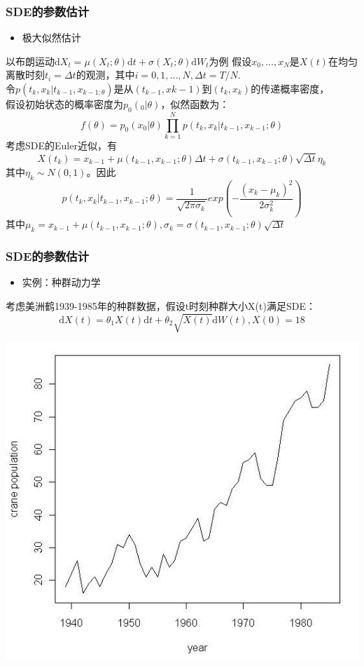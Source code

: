 \documentclass{ctexbeamer}
\begin{document}
	\begin{frame}

	\frametitle{SDE的参数估计}
	\begin{itemize}
	\item 极大似然估计
	\end{itemize}
	以布朗运动$\mathrm{d}X_t = \mu(X_t;\theta)\mathrm{d}t + \sigma(X_t;\theta)\mathrm{d}W_t$为例
	假设$x_0,...,x_N$是$X(t)$在均匀离散时刻$t_i = \Delta t$的观测，其中$i = 0,1,...,N, \Delta t = T/N.$\\
	令$p(t_k,x_k|t_{k-1},x_{k-1;\theta})$是从$(t_{k-1},x{k-1})$到$(t_k,x_k)$的传递概率密度，\\
	假设初始状态的概率密度为$p_0(_0|\theta)$，似然函数为：$$f(\theta) = p_0(x_0|\theta)\prod_{k=1}^Np(t_k,x_k|t_{k-1},x_{k-1};\theta)$$
	考虑SDE的Euler近似，有$$X(t_k) = x_{k-1} + \mu (t_{k-1},x_{k-1};\theta)\Delta t + \sigma(t_{k-1},x_{k-1};\theta)\sqrt{\Delta t}\eta_k$$
	其中$\eta_k \sim N(0,1)$。因此
	$$p(t_k,x_k|t_{k-1},x_{k-1};\theta) = \frac{1}{\sqrt{2\pi\sigma_k}}exp(-\frac{(x_k-\mu_k)^2}{2\sigma_k^2})$$
	其中$\mu_k = x_{k-1} + \mu(t_{k-1},x_{k-1};\theta), \sigma_k = \sigma(t_{k-1},x_{k-1};\theta)\sqrt{\Delta t}$

	\end{frame}

	\begin{frame}

	\frametitle{SDE的参数估计}
	\begin{itemize}
	\item 实例：种群动力学
	\end{itemize}

	考虑美洲鹤1939-1985年的种群数据，假设t时刻种群大小X(t)满足SDE：$$\mathrm{d}X(t) = \theta_1X(t)\mathrm{d}t + \theta_2\sqrt{X(t)}\mathrm{d}W(t), X(0) = 18$$

	\begin{center}
	\includegraphics[width = .6\textwidth]{goose.png}
	\end{center}

	\end{frame}
\end{document}
